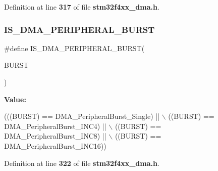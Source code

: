Definition at line \textbf{ 317} of file \textbf{ stm32f4xx\+\_\+dma.\+h}.

\mbox{\label{group__DMA__peripheral__burst_ga7c60961178e2a32e9e364a220a8aca88}} 
\subsubsection{I\+S\+\_\+\+D\+M\+A\+\_\+\+P\+E\+R\+I\+P\+H\+E\+R\+A\+L\+\_\+\+B\+U\+R\+ST}
{\footnotesize\ttfamily \#define I\+S\+\_\+\+D\+M\+A\+\_\+\+P\+E\+R\+I\+P\+H\+E\+R\+A\+L\+\_\+\+B\+U\+R\+ST(\begin{DoxyParamCaption}\item[{}]{B\+U\+R\+ST }\end{DoxyParamCaption})}

{\bfseries Value\+:}
\begin{DoxyCode}
(((BURST) == DMA_PeripheralBurst_Single) || \(\backslash\)
                                        ((BURST) == DMA_PeripheralBurst_INC4)  || \(\backslash\)
                                        ((BURST) == DMA_PeripheralBurst_INC8)  || \(\backslash\)
                                        ((BURST) == DMA_PeripheralBurst_INC16))
\end{DoxyCode}


Definition at line \textbf{ 322} of file \textbf{ stm32f4xx\+\_\+dma.\+h}.


